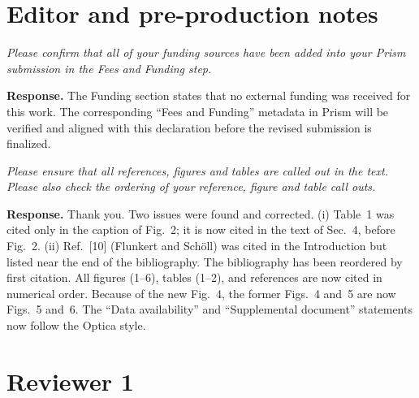 \documentclass[11pt]{article}
\newenvironment{comment}{\par\medskip\noindent\begin{minipage}{\linewidth}\color{rc}\itshape}{\end{minipage}\par\smallskip}
\newcommand{\resp}{\noindent\textbf{Response.} }
\begin{document}
\section*{Editor and pre-production notes}

\begin{comment}Please confirm that all of your funding sources have been added into your Prism submission in the Fees and Funding step.\end{comment}
\resp The Funding section states that no external funding was received for this work. The corresponding ``Fees and Funding'' metadata in Prism will be verified and aligned with this declaration before the revised submission is finalized.

\begin{comment}Please ensure that all references, figures and tables are called out in the text. Please also check the ordering of your reference, figure and table call outs.\end{comment}
\resp Thank you. Two issues were found and corrected. (i) Table~1 was cited only in the caption of Fig.~2; it is now cited in the text of Sec.~4, before Fig.~2. (ii) Ref.~[10] (Flunkert and Sch\"oll) was cited in the Introduction but listed near the end of the bibliography. The bibliography has been reordered by first citation. All figures (1--6), tables (1--2), and references are now cited in numerical order. Because of the new Fig.~4, the former Figs.~4 and~5 are now Figs.~5 and~6. The ``Data availability'' and ``Supplemental document'' statements now follow the Optica style.

\section*{Reviewer 1}
\end{document}

